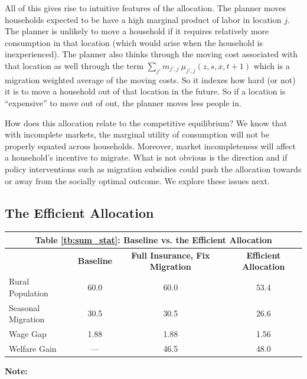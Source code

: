 \documentclass[12pt,pdftex]{article}
\renewcommand{\arraystretch}{1.1}
\begin{document}
\begin{onehalfspacing}
All of this gives rise to intuitive features of the allocation. The planner moves households expected to be have a high marginal product of labor in location $j$. The planner is unlikely to move a household if it requires relatively more consumption in that location (which would arise when the household is inexperienced). The planner also thinks through the moving cost associated with that location as well through the term $\sum_{j'}  m_{j',j} \ \mu_{j',j}(z, s, x, t+1)$ which is a migration weighted average of the moving costs. So it indexes how hard (or not) it is to move a household out of that location in the future. So if a location is ``expensive'' to move out of out, the planner moves less people in.

How does this allocation relate to the competitive equilibrium? We know that with incomplete markets, the marginal utility of consumption will not be properly equated across households. Moreover, market incompleteness will affect a household's incentive to migrate. What is not obvious is the direction and if policy interventions such as migration subsidies could push the allocation towards or away from the socially optimal outcome. We explore these issues next.

\subsection{The Efficient Allocation}

\begin{table}[t!]
\small
\setlength {\tabcolsep}{1.5mm}
\renewcommand{\arraystretch}{2.30}
\begin{center}\label{tb:effecient}
\begin{tabular}{l c c c }
\multicolumn{4}{c}{\normalsize \textbf{Table \ref{tb:sum_stat}: Baseline vs. the Efficient Allocation}}\\
\hline
\hline
\footnotesize   & \footnotesize  \textbf{Baseline} & \footnotesize   \textbf{Full Insurance, Fix Migration} &  \footnotesize \textbf{Efficient Allocation} \\
\cmidrule(lr){2-2} \cmidrule(lr){3-3} \cmidrule(lr){4-4}
\footnotesize  Rural Population  & 60.0  & 60.0   & 53.4      \\
\footnotesize  Seasonal Migration & 30.5   & 30.5 & 26.6 \\
\footnotesize  Wage Gap  & 1.88  & 1.88  & 1.56     \\
\footnotesize Welfare Gain & --- & 46.5 & 48.0 \\
\hline
\end{tabular}
\parbox[c]{6.75in}{\vspace{.1cm}
{\footnotesize \textbf{Note:} }}
\end{center}
\end{table}


\end{onehalfspacing}
\end{document}

